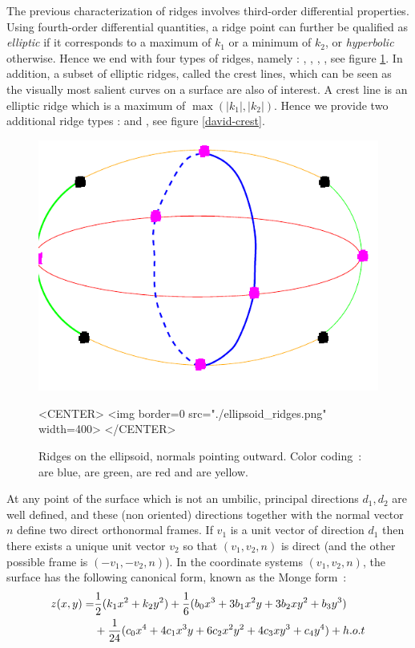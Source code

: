 The previous characterization of ridges involves third-order
differential properties. Using fourth-order differential quantities, a
ridge point can further be qualified as {\em elliptic} if it
corresponds to a maximum of $k_1$ or a minimum of $k_2$, or {\em
hyperbolic} otherwise. Hence we end with four types of ridges, namely
: , , ,
, see figure \ref{ellipsoid-ridges}.
In addition, a subset of elliptic ridges, called the crest lines,
which can be seen as the visually most salient curves on a surface are
also of interest. A crest line is an elliptic ridge which is a maximum
of $\max(|k_1|,|k_2|)$. Hence we provide two additional ridge types :
 and , see figure \ref{david-crest}.


\begin{figure}[!ht]
\begin{ccTexOnly}
\centerline{
\includegraphics[width=.5\linewidth]{Ridges_3/ellipsoid_ridges}}
\end{ccTexOnly}
\caption{Ridges on the ellipsoid, normals pointing outward.
 Color coding~:  are blue,
 are green,  are red and 
 are yellow.}
\label{ellipsoid-ridges}
\begin{ccHtmlOnly}
<CENTER> <img border=0 src="./ellipsoid_ridges.png" width=400>
</CENTER>
\end{ccHtmlOnly}
\end{figure}

At any point of the surface which is not an umbilic, principal
directions $d_1, d_2$ are well defined, and these (non oriented)
directions together with the normal vector $n$ define two direct
orthonormal frames. If $v_1$ is a unit vector of direction $d_1$ then
there exists a unique unit vector $v_2$ so that $(v_1,v_2,n)$ is
direct (and the other possible frame is $(-v_1,-v_2,n)$). In the
coordinate systems $(v_1,v_2,n)$, the surface has the following
canonical form, known as the Monge form~:
%
\begin{eqnarray}
\label{eq:monge}
z(x,y) =  & \frac{1}{2}(k_1x^2 + k_2y^2)+
	\frac{1}{6}(b_0x^3+3b_1x^2y+3b_2xy^2+b_3y^3) \\
  &  +\frac{1}{24}(c_0x^4+4c_1x^3y+6c_2x^2y^2+4c_3xy^3+c_4y^4) + h.o.t
\end{eqnarray}

